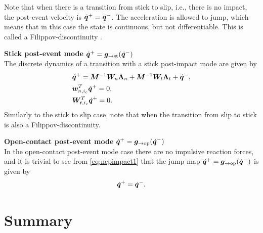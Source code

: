 \documentclass[../DC2017114Bouma.tex]{subfiles}
\begin{document}
Note that when there is a transition from stick to slip, i.e., there is no impact, the post-event velocity is $\dot{{\boldsymbol{q}}}^+ = \dot{{\boldsymbol{q}}}^-$. The acceleration is allowed to jump, which means that in this case the state is continuous, but not differentiable. This is called a Filippov-discontinuity \cite{Filippov1988}.

\textbf{Stick post-event mode} $\dot{{\boldsymbol{q}}}^+ = {\boldsymbol{g}}_{\rightarrow\text{st}}(\dot{{\boldsymbol{q}}}^-)$\\
The discrete dynamics of a transition with a stick post-impact mode are given by
\begin{align}
&\dot{{\boldsymbol{q}}}^+ = {\boldsymbol{M}}^{-1}{\boldsymbol{W}}_{n}\boldsymbol{\Lambda}_{n} + {\boldsymbol{M}}^{-1}{\boldsymbol{W}}_{t}\boldsymbol{\Lambda}_{t} + \dot{{\boldsymbol{q}}}^-,\label{eq:discstick1}\\
&{\boldsymbol{w}}^T_{n,i_c}\dot{{\boldsymbol{q}}}^+ = 0,\label{eq:discstick2}\\
&{\boldsymbol{W}}^T_{t,i_c}\dot{{\boldsymbol{q}}}^+ = 0.\label{eq:discstick3}
\end{align}
Similarly to the stick to slip case, note that when the transition from slip to stick is also a Filippov-discontinuity.

\textbf{Open-contact post-event mode} $\dot{{\boldsymbol{q}}}^+ = {\boldsymbol{g}}_{\rightarrow\text{op}}(\dot{{\boldsymbol{q}}}^-)$\\
In the open-contact post-event mode case there are no impulsive reaction forces, and it is trivial to see from \eqref{eq:ncpimpact1} that the jump map $\dot{{\boldsymbol{q}}}^+ = {\boldsymbol{g}}_{\rightarrow\text{op}}(\dot{{\boldsymbol{q}}}^-)$ is given by
\begin{align}
\dot{{\boldsymbol{q}}}^+ = \dot{{\boldsymbol{q}}}^-.\label{eq:gopen}
\end{align}

\section{Summary}
\end{document}
